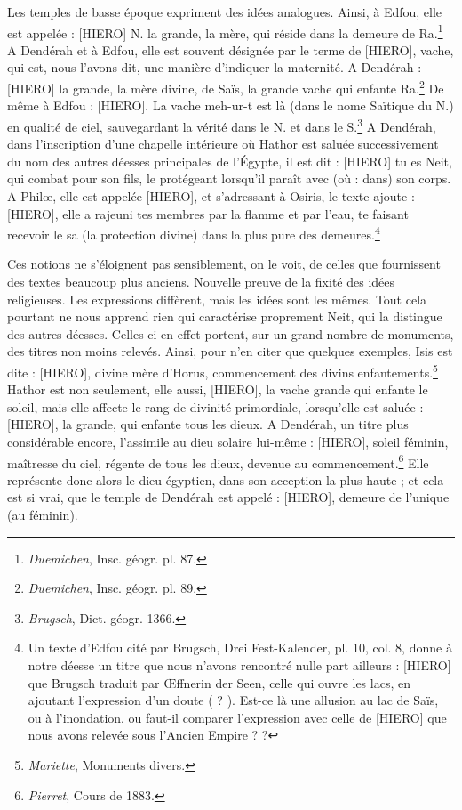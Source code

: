 \documentclass[a4paper, 11pt, oneside]{article}
\begin{document}
Les temples de basse époque expriment des idées analogues. Ainsi, à Edfou, elle est appelée : [HIERO] N. la grande, la mère, qui réside dans la demeure de Ra.\footnote{\emph{Duemichen}, Insc. géogr. pl. 87.} A Dendérah et à Edfou, elle est souvent désignée par le terme de [HIERO], vache, qui est, nous l'avons dit, une manière d'indiquer la maternité. A Dendérah : [HIERO] la grande, la mère divine, de Saïs, la grande vache qui enfante Ra.\footnote{\emph{Duemichen}, Insc. géogr. pl. 89.} De même à Edfou : [HIERO]. La vache meh-ur-t est là (dans le nome Saïtique du N.) en qualité de ciel, sauvegardant la vérité dans le N. et dans le S.\footnote{\emph{Brugsch}, Dict. géogr. 1366.} A Dendérah, dans l'inscription d'une chapelle intérieure où Hathor est saluée successivement du nom des autres déesses principales de l'Égypte, il est dit : [HIERO] tu es Neit, qui combat pour son fils, le protégeant lorsqu'il paraît avec (où : dans) son corps. A Philœ, elle est appelée [HIERO], et s'adressant à Osiris, le texte ajoute : [HIERO], elle a rajeuni tes membres par la flamme et par l'eau, te faisant recevoir le sa (la protection divine) dans la plus pure des demeures.\footnote{Un texte d'Edfou cité par Brugsch, Drei Fest-Kalender, pl. 10, col. 8, donne à notre déesse un titre que nous n'avons rencontré nulle part ailleurs : [HIERO] que Brugsch traduit par Œffnerin der Seen, celle qui ouvre les lacs, en ajoutant l'expression d'un doute ( ? ). Est-ce là une allusion au lac de Saïs, ou à l'inondation, ou faut-il comparer l'expression avec celle de [HIERO] que nous avons relevée sous l'Ancien Empire ? ?}

Ces notions ne s'éloignent pas sensiblement, on le voit, de celles que fournissent des textes beaucoup plus anciens. Nouvelle preuve de la fixité des idées religieuses. Les expressions diffèrent, mais les idées sont les mêmes. Tout cela pourtant ne nous apprend rien qui caractérise proprement Neit, qui la distingue des autres déesses. Celles-ci en effet portent, sur un grand nombre de monuments, des titres non moins relevés. Ainsi, pour n'en citer que quelques exemples, Isis est dite : [HIERO], divine mère d'Horus, commencement des divins enfantements.\footnote{\emph{Mariette}, Monuments divers.} Hathor est non seulement, elle aussi, [HIERO], la vache grande qui enfante le soleil, mais elle affecte le rang de divinité primordiale, lorsqu'elle est saluée : [HIERO], la grande, qui enfante tous les dieux. A Dendérah, un titre plus considérable encore, l'assimile au dieu solaire lui-même : [HIERO], soleil féminin, maîtresse du ciel, régente de tous les dieux, devenue au commencement.\footnote{\emph{Pierret}, Cours de 1883.} Elle représente donc alors le dieu égyptien, dans son acception la plus haute ; et cela est si vrai, que le temple de Dendérah est appelé : [HIERO], demeure de l'unique (au féminin).
\end{document}
